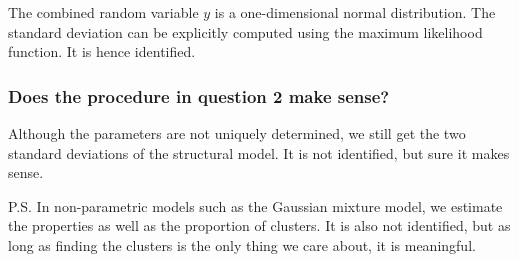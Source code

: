 The combined random variable $y$ is a one-dimensional normal distribution. The standard deviation can be explicitly computed using the maximum likelihood function. It is hence identified. 

\subsubsection{Does the procedure in question 2 make sense?}

Although the parameters are not uniquely determined, we still get the two standard deviations of the structural model. It is not identified, but sure it makes sense. 

P.S. In non-parametric models such as the Gaussian mixture model, we estimate the properties as well as the proportion of clusters. It is also not identified, but as long as finding the clusters is the only thing we care about, it is meaningful. 